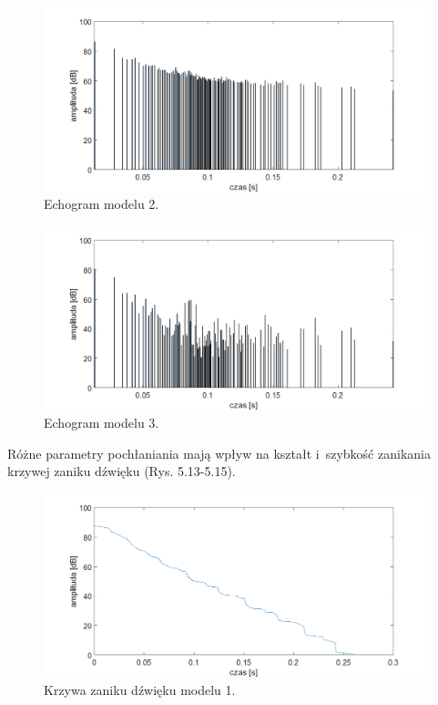 \begin{figure}[h]
        \centering
                \centering
                \includegraphics[width=16cm]{echo2z}
	\caption{Echogram modelu 2.}
\end{figure}

\begin{figure}[h]
        \centering
                \centering
                \includegraphics[width=16cm]{echoz3}
	\caption{Echogram modelu 3.}
\end{figure}

Różne parametry pochłaniania mają wpływ na kształt i~szybkość zanikania krzywej zaniku dźwięku (Rys. 5.13-5.15).

\begin{figure}[h]
        \centering
                \centering
                \includegraphics[width=16cm]{zanikz1}
	\caption{Krzywa zaniku dźwięku modelu 1.}
\end{figure}

